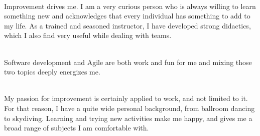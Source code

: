 \documentclass[a4paper, 10pt, onecolumn, oneside]{report}
\begin{document}
\\Improvement drives me. I am a very curious person who is always willing to learn something new and acknowledges that every individual has something to add to my life. As a trained and seasoned instructor, I have developed strong didactics, which I also find very useful while dealing with teams.

\\Software development and Agile are both work and fun for me and mixing those two topics deeply energizes me.

\\My passion for improvement is certainly applied to work, and not limited to it. For that reason, I have a quite wide personal background, from ballroom dancing to skydiving. Learning and trying new activities make me happy, and gives me a broad range of subjects I am comfortable with. 
\end{document}
